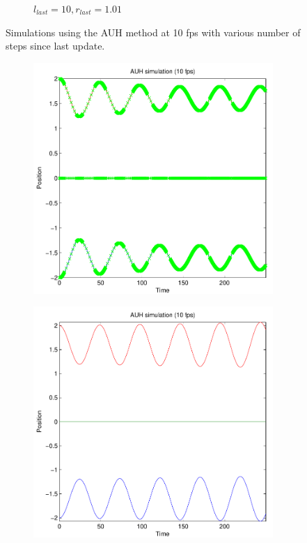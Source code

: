 \documentclass[11pt]{article}
\begin{document}
\begin{figure}[H]
\begin{subfigure}[t]{0.5\textwidth}
        \caption{$l_{last} = 10, r_{last} = 1.01$}
        \label{fig:atomic_multi_both}
    \end{subfigure}
    \caption{Simulations using the AUH method at 10 fps with various number of
    steps since last update.}
    \label{fig:atomic_multi_sbound}
\end{figure}

\begin{figure}
    \begin{subfigure}[t]{0.5\textwidth}
        \includegraphics[width=\textwidth]{../images/atomic_uniform_10fps_0.pdf}
        \caption{}
        \label{fig:atomic_uniform_10fps_0}
    \end{subfigure}
    \begin{subfigure}[t]{0.5\textwidth}
        \includegraphics[width=\textwidth]{../images/atomic_uniform_10fps_1.pdf}

\end{subfigure}
\end{figure}
\end{document}
